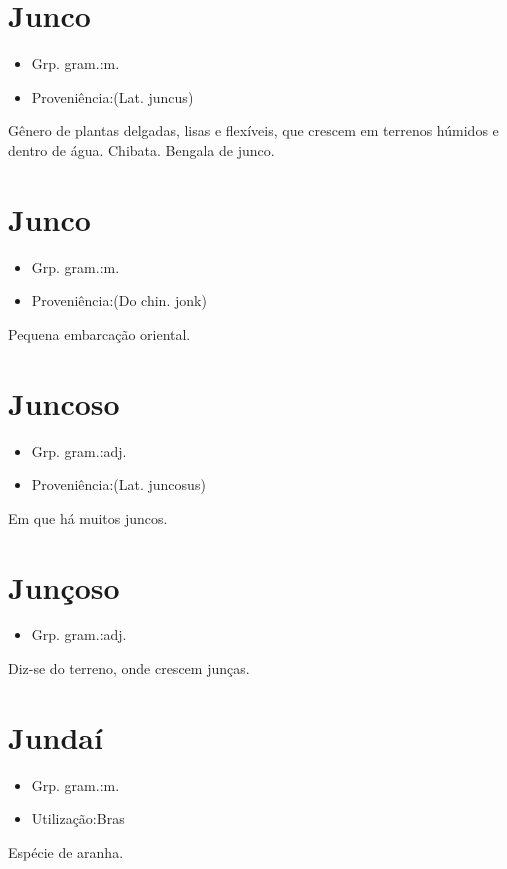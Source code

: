 \documentclass{article}
\begin{document}
\section{Junco}
\begin{itemize}
\item {Grp. gram.:m.}
\end{itemize}
\begin{itemize}
\item {Proveniência:(Lat. \textunderscore juncus\textunderscore )}
\end{itemize}
Gênero de plantas delgadas, lisas e flexíveis, que crescem em terrenos húmidos e dentro de água.
Chibata.
Bengala de junco.
\section{Junco}
\begin{itemize}
\item {Grp. gram.:m.}
\end{itemize}
\begin{itemize}
\item {Proveniência:(Do chin. \textunderscore jonk\textunderscore )}
\end{itemize}
Pequena embarcação oriental.
\section{Juncoso}
\begin{itemize}
\item {Grp. gram.:adj.}
\end{itemize}
\begin{itemize}
\item {Proveniência:(Lat. \textunderscore juncosus\textunderscore )}
\end{itemize}
Em que há muitos juncos.
\section{Junçoso}
\begin{itemize}
\item {Grp. gram.:adj.}
\end{itemize}
Diz-se do terreno, onde crescem junças.
\section{Jundaí}
\begin{itemize}
\item {Grp. gram.:m.}
\end{itemize}
\begin{itemize}
\item {Utilização:Bras}
\end{itemize}
Espécie de aranha.
\end{document}
